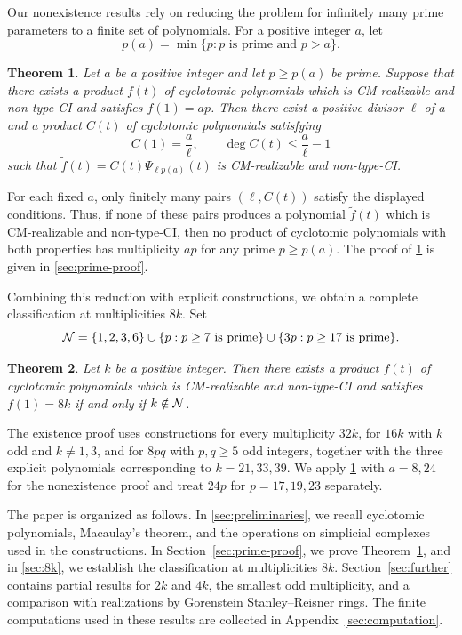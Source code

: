 \documentclass[11pt,a4paper]{amsart}
\newtheorem{theorem}{Theorem}[section]
\theoremstyle{definition}
\theoremstyle{remark}
\newcommand{\Nc}{{\cal N}}
\begin{document}
Our nonexistence results rely on reducing the problem for infinitely many prime parameters to a finite set of polynomials.
For a positive integer $a$, let \[p(a)=\min\{p:p\text{ is prime and }p>a\}.\]
\begin{theorem}\label{thm:prime-reduction}
Let $a$ be a positive integer and let $p\ge p(a)$ be prime. Suppose that there exists a product $f(t)$ of cyclotomic polynomials which is CM-realizable and non-type-CI and satisfies $f(1)=ap$. Then there exist a positive divisor $\ell$ of $a$ and a product $C(t)$ of cyclotomic polynomials satisfying
\[C(1)=\frac{a}{\ell},\qquad \deg C(t)\le\frac{a}{\ell}-1\]
such that $\widetilde f(t)=C(t)\Psi_{\ell p(a)}(t)$ is CM-realizable and non-type-CI.
\end{theorem}
For each fixed $a$, only finitely many pairs $(\ell,C(t))$ satisfy the displayed conditions. Thus, if none of these pairs produces a polynomial $\widetilde f(t)$ which is CM-realizable and non-type-CI, then no product of cyclotomic polynomials with both properties has multiplicity $ap$ for any prime $p\ge p(a)$. The proof of \cref{thm:prime-reduction} is given in \cref{sec:prime-proof}.

Combining this reduction with explicit constructions, we obtain a complete classification at multiplicities $8k$. Set
\begin{equation}\label{eq:exceptional-set}
\Nc=\{1,2,3,6\}\cup\{p:p\ge7\text{ is prime}\}\cup\{3p:p\ge17\text{ is prime}\}.
\end{equation}
\begin{theorem}\label{thm:8k-classification}
Let $k$ be a positive integer. Then there exists a product $f(t)$ of cyclotomic polynomials which is CM-realizable and non-type-CI and satisfies $f(1)=8k$ if and only if $k\notin\Nc$.
\end{theorem}
The existence proof uses constructions for every multiplicity $32k$, for $16k$ with $k$ odd and $k\ne1,3$, and for $8pq$ with $p,q\ge5$ odd integers, together with the three explicit polynomials corresponding to $k=21,33,39$. We apply \cref{thm:prime-reduction} with $a=8,24$ for the nonexistence proof and treat $24p$ for $p=17,19,23$ separately.

The paper is organized as follows. In \cref{sec:preliminaries}, we recall cyclotomic polynomials, Macaulay's theorem, and the operations on simplicial complexes used in the constructions. In Section~\ref{sec:prime-proof}, we prove Theorem~\ref{thm:prime-reduction}, and in \cref{sec:8k}, we establish the classification at multiplicities $8k$. Section~\ref{sec:further} contains partial results for $2k$ and $4k$, the smallest odd multiplicity, and a comparison with realizations by Gorenstein Stanley--Reisner rings. The finite computations used in these results are collected in Appendix~\ref{sec:computation}.
\end{document}

